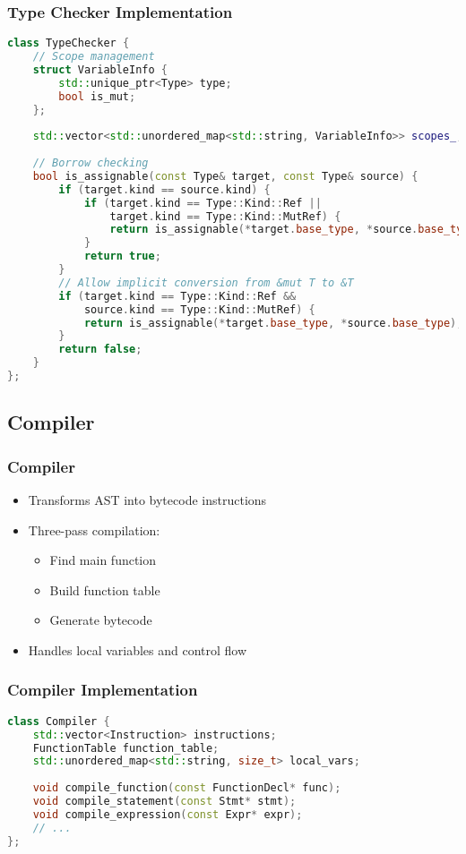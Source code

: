 \documentclass{beamer}
\begin{document}
\begin{frame}[fragile]
\frametitle{Type Checker Implementation}
\begin{lstlisting}[language=C++,basicstyle={\tiny}]
class TypeChecker {
    // Scope management
    struct VariableInfo {
        std::unique_ptr<Type> type;
        bool is_mut;
    };
    
    std::vector<std::unordered_map<std::string, VariableInfo>> scopes_;
    
    // Borrow checking
    bool is_assignable(const Type& target, const Type& source) {
        if (target.kind == source.kind) {
            if (target.kind == Type::Kind::Ref || 
                target.kind == Type::Kind::MutRef) {
                return is_assignable(*target.base_type, *source.base_type);
            }
            return true;
        }
        // Allow implicit conversion from &mut T to &T
        if (target.kind == Type::Kind::Ref && 
            source.kind == Type::Kind::MutRef) {
            return is_assignable(*target.base_type, *source.base_type);
        }
        return false;
    }
};
\end{lstlisting}
\end{frame}

\subsection{Compiler}
\begin{frame}
\frametitle{Compiler}
\begin{itemize}
    \item Transforms AST into bytecode instructions
    \item Three-pass compilation:
    \begin{itemize}
        \item Find main function
        \item Build function table
        \item Generate bytecode
    \end{itemize}
    \item Handles local variables and control flow
\end{itemize}
\end{frame}

\begin{frame}[fragile]
\frametitle{Compiler Implementation}
\begin{lstlisting}[language=C++]
class Compiler {
    std::vector<Instruction> instructions;
    FunctionTable function_table;
    std::unordered_map<std::string, size_t> local_vars;
    
    void compile_function(const FunctionDecl* func);
    void compile_statement(const Stmt* stmt);
    void compile_expression(const Expr* expr);
    // ...
};
\end{lstlisting}
\end{frame}
\end{document}
